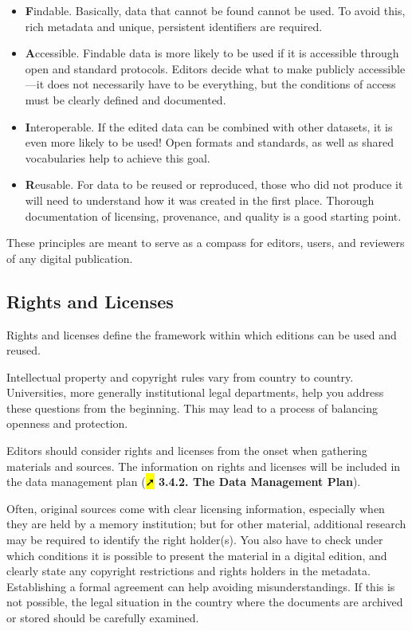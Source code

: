 \documentclass[
  letterpaper,
  DIV=11,
  numbers=noendperiod]{scrreprt}
\begin{document}
\begin{itemize}
\item
  \textbf{F}indable. Basically, data that cannot be found cannot be
  used. To avoid this, rich metadata and unique, persistent identifiers
  are required.
\item
  \textbf{A}ccessible. Findable data is more likely to be used if it is
  accessible through open and standard protocols. Editors decide what to
  make publicly accessible---it does not necessarily have to be
  everything, but the conditions of access must be clearly defined and
  documented.
\item
  \textbf{I}nteroperable. If the edited data can be combined with other
  datasets, it is even more likely to be used! Open formats and
  standards, as well as shared vocabularies help to achieve this goal.
\item
  \textbf{R}eusable. For data to be reused or reproduced, those who did
  not produce it will need to understand how it was created in the first
  place. Thorough documentation of licensing, provenance, and quality is
  a good starting point.
\end{itemize}

These principles are meant to serve as a compass for editors, users, and
reviewers of any digital publication.

\subsection{Rights and Licenses}\label{rights-and-licenses}

Rights and licenses define the framework within which editions can be
used and reused.

Intellectual property and copyright rules vary from country to country.
Universities, more generally institutional legal departments, help you
address these questions from the beginning. This may lead to a process
of balancing openness and protection.

Editors should consider rights and licenses from the onset when
gathering materials and sources. The information on rights and licenses
will be included in the data management plan (\hl{➚} \textbf{3.4.2. The
Data Management Plan}).

Often, original sources come with clear licensing information,
especially when they are held by a memory institution; but for other
material, additional research may be required to identify the right
holder(s). You also have to check under which conditions it is possible
to present the material in a digital edition, and clearly state any
copyright restrictions and rights holders in the metadata. Establishing
a formal agreement can help avoiding misunderstandings. If this is not
possible, the legal situation in the country where the documents are
archived or stored should be carefully examined.
\end{document}
